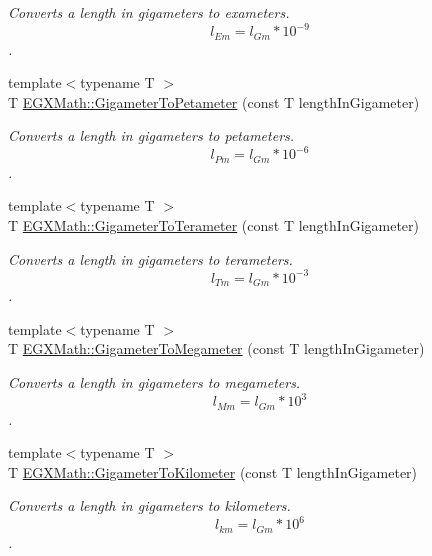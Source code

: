 \begin{DoxyCompactItemize}
\begin{DoxyCompactList}\small\item\em Converts a length in gigameters to exameters. \[ l_{Em}=l_{Gm} * 10^{-9} \]. \end{DoxyCompactList}\item 
{\footnotesize template$<$typename T $>$ }\\T \mbox{\hyperlink{group___e_g_x_math-_conversions-_length_conversions-_s_i-_gigameter-_s_i_gae0dceabe14b5e84394285441be46bb8d}{E\+G\+X\+Math\+::\+Gigameter\+To\+Petameter}} (const T length\+In\+Gigameter)
\begin{DoxyCompactList}\small\item\em Converts a length in gigameters to petameters. \[ l_{Pm}=l_{Gm} * 10^{-6} \]. \end{DoxyCompactList}\item 
{\footnotesize template$<$typename T $>$ }\\T \mbox{\hyperlink{group___e_g_x_math-_conversions-_length_conversions-_s_i-_gigameter-_s_i_ga7cab1971a673d663a4eadd070afedf7e}{E\+G\+X\+Math\+::\+Gigameter\+To\+Terameter}} (const T length\+In\+Gigameter)
\begin{DoxyCompactList}\small\item\em Converts a length in gigameters to terameters. \[ l_{Tm}=l_{Gm} * 10^{-3} \]. \end{DoxyCompactList}\item 
{\footnotesize template$<$typename T $>$ }\\T \mbox{\hyperlink{group___e_g_x_math-_conversions-_length_conversions-_s_i-_gigameter-_s_i_ga13984c61b3aaa41953de2415c6981f37}{E\+G\+X\+Math\+::\+Gigameter\+To\+Megameter}} (const T length\+In\+Gigameter)
\begin{DoxyCompactList}\small\item\em Converts a length in gigameters to megameters. \[ l_{Mm}=l_{Gm} * 10^{3} \]. \end{DoxyCompactList}\item 
{\footnotesize template$<$typename T $>$ }\\T \mbox{\hyperlink{group___e_g_x_math-_conversions-_length_conversions-_s_i-_gigameter-_s_i_ga6f5a65da868d2c40485588dff765836e}{E\+G\+X\+Math\+::\+Gigameter\+To\+Kilometer}} (const T length\+In\+Gigameter)
\begin{DoxyCompactList}\small\item\em Converts a length in gigameters to kilometers. \[ l_{km}=l_{Gm} * 10^{6} \]. \end{DoxyCompactList}\item 

\end{DoxyCompactItemize}
